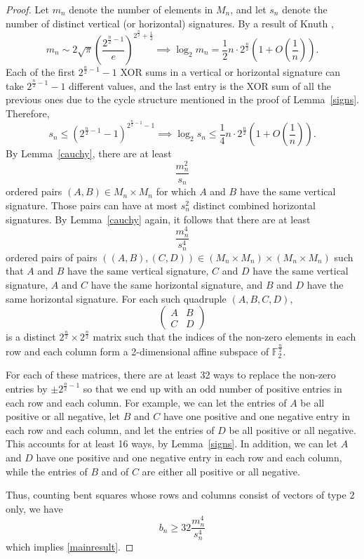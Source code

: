\documentclass{article}
\theoremstyle{definition}
\theoremstyle{remark}
\theoremstyle{definition}
\newcommand{\F}{\mathbb{F}}
\begin{document}
\begin{proof}
Let $m_n$ denote the number of elements in $M_n$, and let $s_n$ denote the number of distinct vertical (or horizontal) signatures. By a result of Knuth \cite{knuth}, $$m_n \sim 2\sqrt{\pi} \left(\frac{2^{\frac{n}{2}-1}}{e}\right)^{2^{\frac{n}{2}}+\frac{1}{2}} \implies \operatorname{log}_2 m_n = \frac{1}{2}n \cdot 2^{\frac{n}{2}}\left(1 + O\left( \frac{1}{n} \right)\right).$$ Each of the first $2^{\frac{n}{2}-1}-1$ XOR sums in a vertical or horizontal signature can take $2^{\frac{n}{2}-1}-1$ different values, and the last entry is the XOR sum of all the previous ones due to the cycle structure mentioned in the proof of Lemma~\ref{signs}. Therefore, $$s_n \leq \left(2^{\frac{n}{2}-1}-1\right)^{2^{\frac{n}{2}-1}-1} \implies \operatorname{log}_2 s_n \leq \frac{1}{4}n \cdot 2^{\frac{n}{2}}\left(1 + O\left( \frac{1}{n} \right) \right).$$ By Lemma~\ref{cauchy}, there are at least $$\frac{m_n^2}{s_n}$$ ordered pairs $(A, B) \in M_n \times M_n$ for which $A$ and $B$ have the same vertical signature. Those pairs can have at most $s_n^2$ distinct combined horizontal signatures. By Lemma~\ref{cauchy} again, it follows that there are at least $$\frac{m_n^4}{s_n^4}$$ ordered pairs of pairs $((A, B), (C, D)) \in (M_n \times M_n) \times (M_n \times M_n)$ such that $A$ and $B$ have the same vertical signature, $C$ and $D$ have the same vertical signature, $A$ and $C$ have the same horizontal signature, and $B$ and $D$ have the same horizontal signature. For each such quadruple $(A, B, C, D)$, $$\left(\begin{matrix}A & B \\ C & D\end{matrix}\right)$$ is a distinct $2^{\frac{n}{2}} \times 2^{\frac{n}{2}}$ matrix such that the indices of the non-zero elements in each row and each column form a 2-dimensional affine subspace of $\F_2^{\frac{n}{2}}$.

For each of these matrices, there are at least 32 ways to replace the non-zero entries by $\pm 2^{\frac{n}{2}-1}$ so that we end up with an odd number of positive entries in each row and each column. For example, we can let the entries of $A$ be all positive or all negative, let $B$ and $C$ have one positive and one negative entry in each row and each column, and let the entries of $D$ be all positive or all negative. This accounts for at least 16 ways, by Lemma~\ref{signs}. In addition, we can let $A$ and $D$ have one positive and one negative entry in each row and each column, while the entries of $B$ and of $C$ are either all positive or all negative.

Thus, counting bent squares whose rows and columns consist of vectors of type 2 only, we have
\begin{equation}\label{specific}
b_n \geq 32 \frac{m_n^4}{s_n^4}
\end{equation}
which implies \eqref{mainresult}.
\end{proof}
\end{document}
